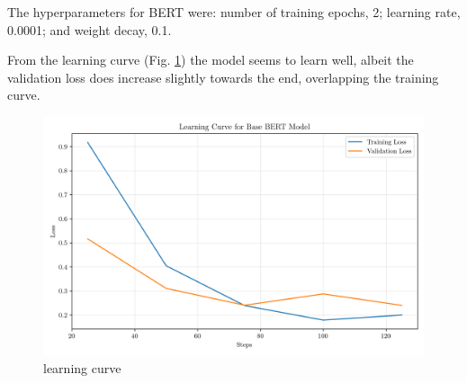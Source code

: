 \documentclass[conference]{IEEEtran}
\begin{document}
The hyperparameters for BERT were: number of training epochs, 2; learning rate, 0.0001; and weight decay, 0.1.







From the learning curve (Fig. \ref{fig:base_bert_learning_curve}) the model seems to learn well, albeit the validation loss does increase slightly towards the end, overlapping the training curve.

\begin{figure}[H]
    \centering
    \includegraphics[width=1\linewidth]{assets/base_bert_learning_curve.png}
    \caption{learning curve}
    \label{fig:base_bert_learning_curve}
\end{figure}
\end{document}
